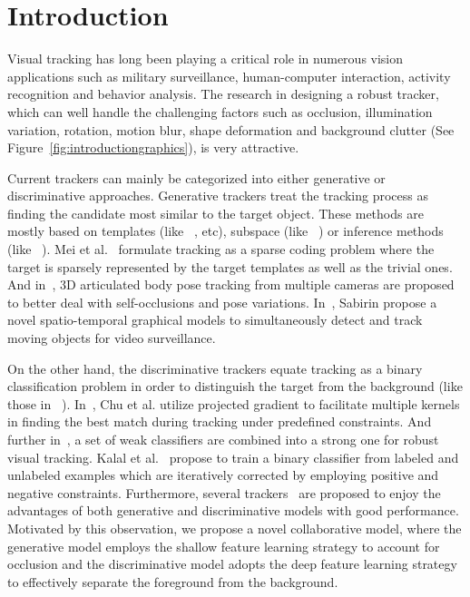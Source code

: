 \documentclass[preprint,12pt,review]{elsarticle}
\begin{document}
\section{Introduction}
Visual tracking has long been playing a critical role in numerous vision applications such as military surveillance, human-computer interaction, activity recognition and behavior analysis.
The research in designing a robust tracker, which can well handle the challenging factors such as occlusion, illumination variation, rotation, motion blur, shape deformation and background clutter (See Figure~\ref{fig:introductiongraphics}), is very attractive.

Current trackers can mainly be categorized into either generative or discriminative approaches.
Generative trackers treat the tracking process as finding the candidate most similar to the target object.
These methods are mostly based on templates (like ~\cite{barnard2014robust, adam2006Frag, jia2012visual, meixue_L1_2009, zhuang2014visual, zhang2013gpu, suau2012real}, etc), subspace (like ~\cite{wang2013online, ross2008incremental}) or inference methods (like ~\cite{xie2013tracking, sabirin2012moving}).
Mei et al.~\cite{meixue_L1_2009} formulate tracking as a sparse coding problem where the target is sparsely represented by the target templates as well as the trivial ones.
And in~\cite{zhang2013gpu}, 3D articulated body pose tracking from multiple cameras are proposed to better deal with self-occlusions and pose variations.
In~\cite{sabirin2012moving}, Sabirin propose a novel spatio-temporal graphical models to simultaneously detect and track moving objects for video surveillance.



On the other hand, the discriminative trackers equate tracking as a binary classification problem in order to distinguish the target from the background (like those in ~\cite{avidan2007ensemble, kalal2010pn, babenko2009visual, grabner2008semi, chu2013tracking}).
In~\cite{chu2013tracking}, Chu et al. utilize projected gradient to facilitate multiple kernels in finding the best match during tracking under predefined constraints.
And further in~\cite{avidan2007ensemble}, a set of weak classifiers are combined into a strong one for robust visual tracking.
Kalal et al.~\cite{kalal2010pn} propose to train a binary classifier from labeled and unlabeled examples which are iteratively corrected by employing positive and negative constraints.
Furthermore, several trackers~\cite{zhong2012robust, yu2008online, liu2009robust, dinh2011co} are proposed to enjoy the advantages of both generative and discriminative models with good performance.
Motivated by this observation, we propose a novel collaborative model, where the generative model employs the shallow feature learning strategy to account for occlusion and the discriminative model adopts the deep feature learning strategy to effectively separate the foreground from the background.
\end{document}
